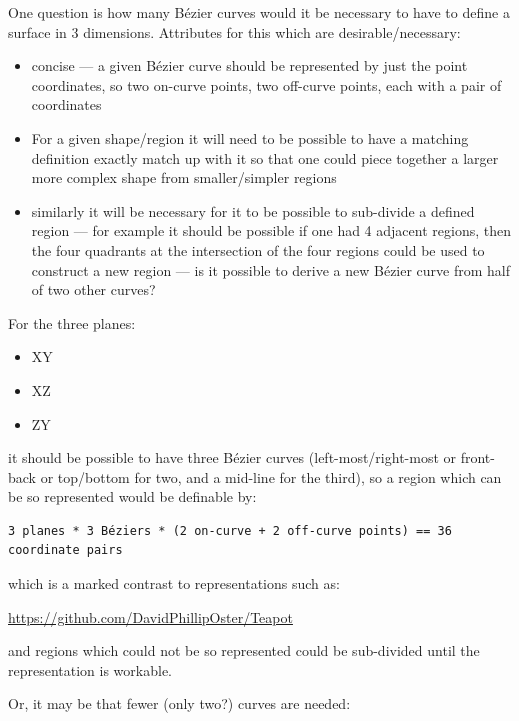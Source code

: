 \documentclass{ltxdoc}
\begin{document}
One question is how many Bézier curves would it be necessary to have to define a surface in 3 dimensions. Attributes for this which are desirable/necessary:

\begin{itemize}
\item concise --- a given Bézier curve should be represented by just the point coordinates, 
      so two on-curve points, two off-curve points, each with a pair of coordinates
\item For a given shape/region it will need to be possible to have a matching definition 
      exactly match up with it so that one could piece together a larger more complex shape 
      from smaller/simpler regions
\item similarly it will be necessary for it to be possible to sub-divide a defined region --- 
      for example it should be possible if one had 4 adjacent regions, then the four quadrants 
      at the intersection of the four regions could be used to construct a new region --- is it
      possible to derive a new Bézier curve from half of two other curves?
\end{itemize}

\begin{samepage}
For the three planes:

\begin{itemize}
 \item XY
 \item XZ
 \item ZY
\end{itemize}
 
\noindent it should be possible to have three Bézier curves (left-most/right-most or front-back or top/bottom for two, and a mid-line for the third), so a region which can be so represented would be definable by:
 
\begin{verbatim}
3 planes * 3 Béziers * (2 on-curve + 2 off-curve points) == 36 coordinate pairs
\end{verbatim}
\end{samepage}
 
\noindent which is a marked contrast to representations such as:
 
\url{https://github.com/DavidPhillipOster/Teapot}

\noindent and regions which could not be so represented could be sub-divided until the representation is workable.

Or, it may be that fewer (only two?) curves are needed:
\end{document}
